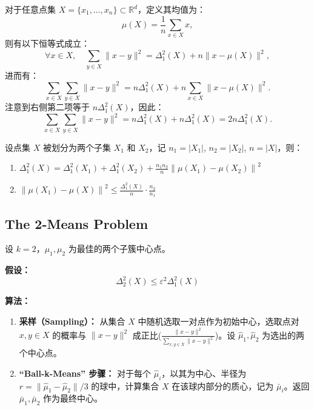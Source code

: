 \documentclass[lang=cn,newtx,10pt,scheme=chinese,chinesefont=nofont,citestyle=gb7714-2015, bibstyle=gb7714-2015]{elegantbook}
\begin{document}
\begin{refsection}
\begin{lemma}
    对于任意点集 $X = \{x_1, \dots, x_n\} \subset \mathbb{R}^d$，定义其均值为：
\[
\mu(X) = \frac{1}{n} \sum_{x \in X} x,
\]
则有以下恒等式成立：
\[
\forall x \in X,\quad \sum_{y \in X} \|x - y\|^2 = \Delta_1^2(X) + n \|x - \mu(X)\|^2,
\]
进而有：
\[
\sum_{x \in X} \sum_{y \in X} \|x - y\|^2 = n\Delta_1^2(X) + n \sum_{x \in X} \|x - \mu(X)\|^2.
\]
注意到右侧第二项等于 $n \Delta_1^2(X)$，因此：
\[
\sum_{x \in X} \sum_{y \in X} \|x - y\|^2 = n \Delta_1^2(X) + n \Delta_1^2(X) = 2n \Delta_1^2(X).
\]
\end{lemma}

\begin{lemma}
    设点集 $X$ 被划分为两个子集 $X_1$ 和 $X_2$，记 $n_1 = |X_1|$, $n_2 = |X_2|$, $n = |X|$，则：

\begin{enumerate}
  \item $\Delta_1^2(X) = \Delta_1^2(X_1) + \Delta_1^2(X_2) + \frac{n_1 n_2}{n} \left\| \mu(X_1) - \mu(X_2) \right\|^2$
  
  \item $ \left\| \mu(X_1) - \mu(X) \right\|^2 \leq \frac{\Delta_1^2(X)}{n} \cdot \frac{n_2}{n_1}$

\end{enumerate}
\end{lemma}

\subsection{The 2-Means Problem}

设 $k = 2$，$\mu_1, \mu_2$ 为最佳的两个子簇中心点。

\textbf{假设：}
\[
\Delta_2^2(X) \leq \varepsilon^2 \Delta_1^2(X)
\]

\textbf{算法：}

\begin{enumerate}
    \item \textbf{采样（Sampling）：} 从集合 $X$ 中随机选取一对点作为初始中心，选取点对 $x, y \in X$ 的概率与 $\|x - y\|^2$ 成正比($\frac{\|x - y\|^2}{\sum_{x, y \in X} \|x - y\|^2}$)。设 $\hat{\mu}_1, \hat{\mu}_2$ 为选出的两个中心点。
    
    \item \textbf{“Ball-k-Means” 步骤：} 对于每个 $\hat{\mu}_i$，以其为中心、半径为 $r = \|\hat{\mu}_1 - \hat{\mu}_2\| / 3$ 的球中，计算集合 $X$ 在该球内部分的质心，记为 $\bar{\mu}_i$。返回 $\bar{\mu}_1, \bar{\mu}_2$ 作为最终中心。
\end{enumerate}



\end{refsection}
\end{document}

